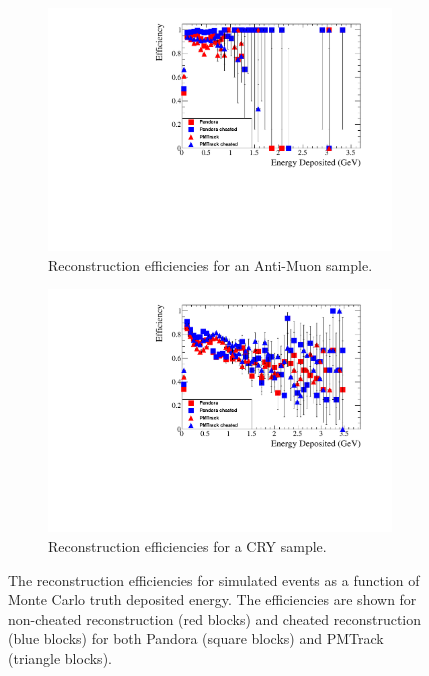 \begin{figure}[h!]
  \centering
  \begin{subfigure}{0.45\textwidth}
    \centering
    \includegraphics[width=\textwidth]{Effic_AntiMuon_500V_All_EnDepos}
    \caption{Reconstruction efficiencies for an Anti-Muon sample.}
    \label{fig:SimEffic_EnDepos_AMu}
  \end{subfigure}
  \hspace{0.08\textwidth}
  \begin{subfigure}{0.45\textwidth}
    \centering
    \includegraphics[width=\textwidth]{Effic_Cosmics_500V_All_EnDepos}
    \caption{Reconstruction efficiencies for a CRY sample.}
    \label{fig:SimEffic_EnDepos_CRY}
  \end{subfigure}
  \caption[The reconstruction efficiencies for simulated events as a function of Monte Carlo truth deposited energy.]
          {The reconstruction efficiencies for simulated events as a function of Monte Carlo truth deposited energy. The efficiencies are shown for non-cheated reconstruction (red blocks) and cheated reconstruction (blue blocks) for both Pandora (square blocks) and PMTrack (triangle blocks).}
          \label{fig:SimEffic_EnDepos}
\end{figure}

